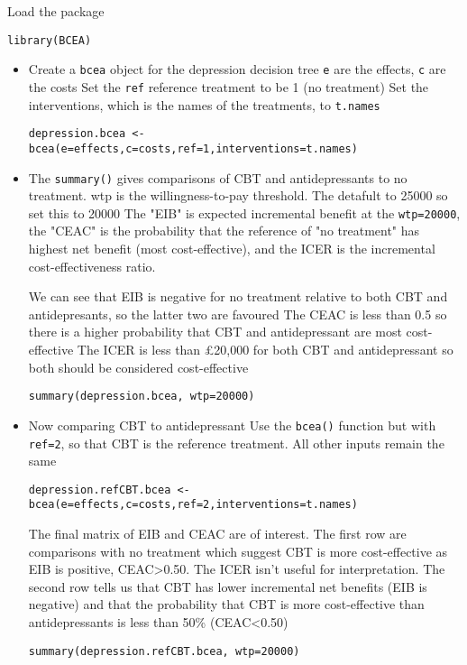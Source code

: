 \documentclass[a4paper,twoside,openany]{../svmonoBUGS}\usepackage[]{graphicx}\usepackage[]{color}
\begin{document}
Load the package
\begin{verbatim}
library(BCEA)
\end{verbatim}

\begin{itemize}
\item Create a \texttt{bcea} object for the depression decision tree
\texttt{e} are the effects, \texttt{c} are the costs
Set the \texttt{ref} reference treatment to be 1 (no treatment)
Set the interventions, which is the names of the treatments, to \texttt{t.names}
\begin{verbatim}
depression.bcea <- bcea(e=effects,c=costs,ref=1,interventions=t.names)
\end{verbatim}

\item
The \texttt{summary()} gives comparisons of CBT and antidepressants to no treatment. 
wtp is the willingness-to-pay threshold. The detafult to 25000 so set this to 20000
The "EIB" is expected incremental benefit at the \texttt{wtp=20000}, the "CEAC" is the
probability that the reference of "no treatment" has highest net benefit (most cost-effective), 
and the ICER is the incremental cost-effectiveness ratio. 

We can see that EIB is negative for no treatment relative to both CBT and antidepresants, so the latter two are favoured
The CEAC is less than 0.5 so there is a higher probability that CBT and antidepressant are most cost-effective
The ICER is less than £20,000 for both CBT and antidepressant so both should be considered cost-effective
\begin{verbatim}
summary(depression.bcea, wtp=20000) 
\end{verbatim}

\item
Now comparing CBT to antidepressant
Use the \texttt{bcea()} function but with \texttt{ref=2}, so that CBT is the reference treatment.
All other inputs remain the same
\begin{verbatim}
depression.refCBT.bcea <- bcea(e=effects,c=costs,ref=2,interventions=t.names)
\end{verbatim}

The final matrix of EIB and CEAC are of interest.
The first row are comparisons with no treatment which suggest CBT is more cost-effective as EIB is positive,
CEAC>0.50. The ICER isn't useful for interpretation.
The second row tells us that CBT has lower incremental net benefits (EIB is negative) and that the probability
that CBT is more cost-effective than antidepressants is less than 50\% (CEAC<0.50)
\begin{verbatim}
summary(depression.refCBT.bcea, wtp=20000)
\end{verbatim}


\end{itemize}
\end{document}
